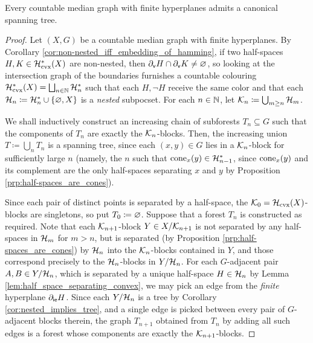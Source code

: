 \documentclass[reqno]{amsart}
\begin{document}
    \begin{proposition}\label{prp:canonical_spanning_trees}
        Every countable median graph with finite hyperplanes admits a {\color{red}canonical} spanning tree.
    \end{proposition}
    \begin{proof}
        Let $(X,G)$ be a countable median graph with finite hyperplanes. By Corollary \ref{cor:non-nested_iff_embedding_of_hamming}, if two half-spaces $H,K\in\mc{H}^\ast_\mathrm{cvx}(X)$ are non-nested, then $\del_\mathsf{v}H\cap\del_\mathsf{v}K\neq\em$, so looking at the intersection graph of the boundaries furnishes a countable colouring $\mc{H}^\ast_\mathrm{cvx}(X)=\bigsqcup_{n\in\N}\mc{H}^\ast_n$ such that each $H,\lnot H$ receive the same color and that each $\mc{H}_n\coloneqq\mc{H}_n^\ast\cup\l\{\em,X\r\}$ is a \textit{nested} subpocset. For each $n\in\N$, let $\mc{K}_n\coloneqq\bigcup_{m\geq n}\mc{H}_m$.

        We shall inductively construct an increasing chain of subforests $T_n\subseteq G$ such that the components of $T_n$ are exactly the $\mc{K}_n$-blocks. Then, the increasing union $T\coloneqq\bigcup_nT_n$ is a spanning tree, since each $(x,y)\in G$ lies in a $\mc{K}_n$-block for sufficiently large $n$ (namely, the $n$ such that $\cone_x(y)\in\mc{H}^\ast_{n-1}$, since $\cone_x(y)$ and its complement are the only half-spaces separating $x$ and $y$ by Proposition \ref{prp:half-spaces_are_cones}).

        Since each pair of distinct points is separated by a half-space, the $\mc{K}_0=\mc{H}_\mathrm{cvx}(X)$-blocks are singletons, so put $T_0\coloneqq\em$. Suppose that a forest $T_n$ is constructed as required. Note that each $\mc{K}_{n+1}$-block $Y\in X/\mc{K}_{n+1}$ is not separated by any half-spaces in $\mc{H}_m$ for $m>n$, but is separated (by Proposition \ref{prp:half-spaces_are_cones}) by $\mc{H}_n$ into the $\mc{K}_n$-blocks contained in $Y$, and those correspond precisely to the $\mc{H}_n$-blocks in $Y/\mc{H}_n$. For each $G$-adjacent pair $A,B\in Y/\mc{H}_n$, which is separated by a unique half-space $H\in\mc{H}_n$ by Lemma \ref{lem:half_space_separating_convex}, we may pick an edge from the \textit{finite} hyperplane $\del_\mathsf{ie}H$. Since each $Y/\mc{H}_n$ is a tree by Corollary \ref{cor:nested_implies_tree}, and a single edge is picked between every pair of $G$-adjacent blocks therein, the graph $T_{n+1}$ obtained from $T_n$ by adding all such edges is a forest whose components are exactly the $\mc{K}_{n+1}$-blocks.
    \end{proof}
\end{document}
